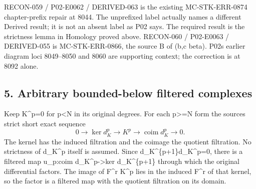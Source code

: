 \documentclass[11pt]{article}
\begin{document}
RECON-059 /\allowbreak{} P02-E0062 /\allowbreak{} DERIVED-063 is the existing MC-STK-ERR-0874 chapter-prefix repair at 8044. The unprefixed label actually names a different Derived result; it is not an absent label as P02 says. The required result is the strictness lemma in Homology proved above. RECON-060 /\allowbreak{} P02-E0063 /\allowbreak{} DERIVED-055 is MC-STK-ERR-0866,\allowbreak{} the source B of (b,\allowbreak{}c beta)\allowbreak{}. P02\textquotesingle s earlier diagram loci 8049–\allowbreak{}8050 and 8060 are supporting context; the correction is at 8092 alone.

\subsection{5. Arbitrary bounded-below filtered complexes}\label{proofs-7589-8350-arbitrary-bounded-below-filtered-complexes}

Keep K\textasciicircum{}p\allowbreak{}=0 for p\textless N in its original degrees. For each p>\allowbreak{}=N form the source\textquotesingle s strict short exact sequence \[
 0\to\ker d_K^p\to K^p
       \to\operatorname{coim}d_K^p\to0.                      \tag{5.1}
\] The kernel has the induced filtration and the coimage the quotient filtration. No strictness of d\_\allowbreak{}K\textasciicircum{}p itself is assumed. Since d\_\allowbreak{}K\textasciicircum{}\{p\allowbreak{}+1\}d\_\allowbreak{}K\textasciicircum{}p\allowbreak{}=0,\allowbreak{} there is a filtered map u\_\allowbreak{}p:\allowbreak{}coim d\_\allowbreak{}K\textasciicircum{}p\allowbreak{}->ker d\_\allowbreak{}K\textasciicircum{}\{p\allowbreak{}+1\} through which the original differential factors. The image of F\^{}r K\^{}p lies in the induced F\^{}r of that kernel,\allowbreak{} so the factor is a filtered map with the quotient filtration on its domain.
\end{document}
